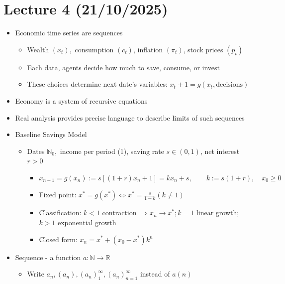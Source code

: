 \documentclass{article}
\begin{document}
\section{Lecture 4 (21/10/2025)}
\begin{itemize}
\subsection{Slide 3 (Analysis: Sequences, Series, and Convergence)}
    \item Economic time series are sequences
    \begin{itemize}
        \item Wealth $(x_t),$ consumption $(c_t)$, inflation $(\pi_t)$, stock prices $(p_t)$
        \item Each data, agents decide how much to save, consume, or invest
        \item These choices determine next date's variables: $x_t+1 = g(x_t, \text{decisions})$
    \end{itemize}
    \item Economy is a system of recursive equations
    \item Real analysis provides precise language to describe limits of such sequences
    \item Baseline Savings Model
    \begin{itemize}
        \item Dates $\mathbb{N}_0,$ income per period (1), saving rate $s \in (0,1)$, net interest $r>0$
        \begin{itemize}
            \item $x_{n+1} = g(x_n) := s[(1+r)x_n+1] = kx_n+s, \qquad k := s(1+r), \quad x_0 \ge 0$
            \item Fixed point: $x^*=g(x^*) \Longleftrightarrow x^* = \frac{s}{1-k} (k \neq 1)$
            \item Classification: $k < 1$ contraction $\Rightarrow x_n \rightarrow x^*; k=1$ linear growth; $k>1$ exponential growth
            \item Closed form: $x_n = x^* + (x_0 - x^*)k^n$
        \end{itemize}
    \end{itemize}
    \item Sequence - a function $a: \mathbb{N} \rightarrow \mathbb{R}$
    \begin{itemize}
        \item Write $a_n,(a_n),(a_n)_1^\infty, (a_n)_{n=1}^\infty$ instead of $a(n)$
    \end{itemize}

\end{itemize}
\end{document}
